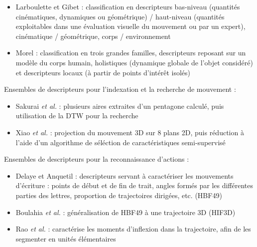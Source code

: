     \begin{frame}{\subsecname}
        \begin{itemize}[label=$\bullet$]
            \item Larboulette et Gibet : classification en descripteurs bas-niveau (quantités cinématiques, dynamiques ou géométrique) / haut-niveau (quantités exploitables dans une évaluation visuelle du mouvement ou par un expert), cinématique / géométrique, corps / environnement 
            \item Morel : classification en trois grandes familles, descripteurs reposant sur un modèle du corps humain, holistiques (dynamique globale de l'objet considéré) et descripteurs locaux (à partir de points d'intérêt isolés) 
        \end{itemize}
    \end{frame}
    
    \begin{frame}{\subsecname}
        Ensembles de descripteurs pour l'indexation et la recherche de mouvement :
        \begin{itemize}[label=$\bullet$]
            \item Sakurai \textit{et al.} : plusieurs aires extraites d'un pentagone calculé, puis utilisation de la DTW pour la recherche 
            \item Xiao \textit{et al.} : projection du mouvement 3D sur 8 plans 2D, puis réduction à l'aide d'un algorithme de séléction de caractéristiques semi-supervisé 
        \end{itemize}
    \end{frame}
    
    \begin{frame}{\subsecname}
        Ensembles de descripteurs pour la reconnaissance d'actions :
        \begin{itemize}[label=$\bullet$]
            \item  Delaye et Anquetil : descripteurs servant à caractériser les mouvements d'écriture : points de début et de fin de trait, angles formés par les différentes parties des lettres, proportion de trajectoires dirigées, etc. (HBF49) 
            \item Boulahia \textit{et al.} : généralisation de HBF49 à une trajectoire 3D (HIF3D) 
            \item Rao \textit{et al.} : caractérise les moments d'inflexion dans la trajectoire, afin de les segmenter en unités élémentaires 
        \end{itemize}
    \end{frame}
    
